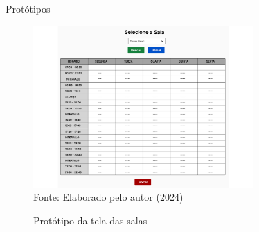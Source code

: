 \begin{frame}{Protótipos}
    \begin{figure}
        \centering
        \vspace{-0.5cm}
        \caption{Protótipo da tela das salas}
        \vspace{-0.2cm}
        \includegraphics[width=0.75\textwidth]{figuras/proto-5.png}
        \\ %
        \footnotesize Fonte: Elaborado pelo autor (2024)
    \end{figure}
\end{frame}


